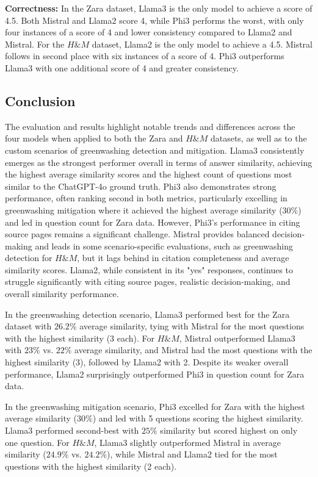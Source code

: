 \documentclass[]{article}
\begin{document}
\textbf{Correctness:}
In the Zara dataset, Llama3 is the only model to achieve a score of 4.5. Both Mistral and Llama2 score 4, while Phi3 performs the worst, with only four instances of a score of 4 and lower consistency compared to Llama2 and Mistral.  
For the $H\&M$ dataset, Llama2 is the only model to achieve a 4.5. Mistral follows in second place with six instances of a score of 4. Phi3 outperforms Llama3 with one additional score of 4 and greater consistency.

\subsection{Conclusion}
The evaluation and results highlight notable trends and differences across the four models when applied to both the Zara and $H\&M$ datasets, 
as well as to the custom scenarios of greenwashing detection and mitigation.
Llama3 consistently emerges as the strongest performer overall in terms of answer similarity, 
achieving the highest average similarity scores and the highest count of questions most similar to the ChatGPT-4o ground truth.
Phi3 also demonstrates strong performance, often ranking second in both metrics, particularly excelling in greenwashing mitigation where it achieved the highest average similarity ($30\%$) and led in question count for Zara data. 
However, Phi3’s performance in citing source pages remains a significant challenge. Mistral provides balanced decision-making and leads in some scenario-specific evaluations,
such as greenwashing detection for $H\&M$, but it lags behind in citation completeness and average similarity scores. Llama2, while consistent in its "yes" responses, continues to struggle significantly with citing source pages, realistic decision-making, and overall similarity performance.

In the greenwashing detection scenario, Llama3 performed best for the Zara dataset with $26.2\%$ average similarity, tying with Mistral for the most questions with the highest similarity (3 each). For $H\&M$, Mistral outperformed Llama3 with $23\%$ vs. $22\%$ average similarity, 
and Mistral had the most questions with the highest similarity (3), followed by Llama2 with 2. Despite its weaker overall performance, Llama2 surprisingly outperformed Phi3 in question count for Zara data.

In the greenwashing mitigation scenario, Phi3 excelled for Zara with the highest average similarity ($30\%$) and led with 5 questions scoring the highest similarity. Llama3 performed second-best with $25\%$ similarity but scored highest on only one question. 
For $H\&M$, Llama3 slightly outperformed Mistral in average similarity ($24.9\%$ vs. $24.2\%$), while Mistral and Llama2 tied for the most questions with the highest similarity (2 each).
\end{document}
